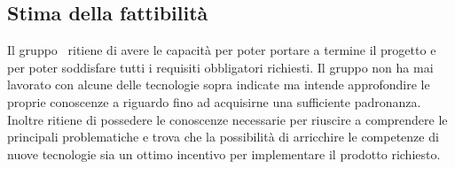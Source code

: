 	\subsection{Stima della fattibilità}
		Il gruppo \groupname\ ritiene di avere le capacità per poter portare a termine il progetto e per poter soddisfare tutti i requisiti obbligatori richiesti. Il gruppo non ha mai lavorato con alcune delle tecnologie sopra indicate ma intende approfondire le proprie conoscenze a riguardo fino ad acquisirne una sufficiente padronanza. Inoltre ritiene di possedere le conoscenze necessarie per riuscire a comprendere le principali problematiche e trova che la possibilità di arricchire le competenze di nuove tecnologie sia un ottimo incentivo per implementare il prodotto richiesto.

